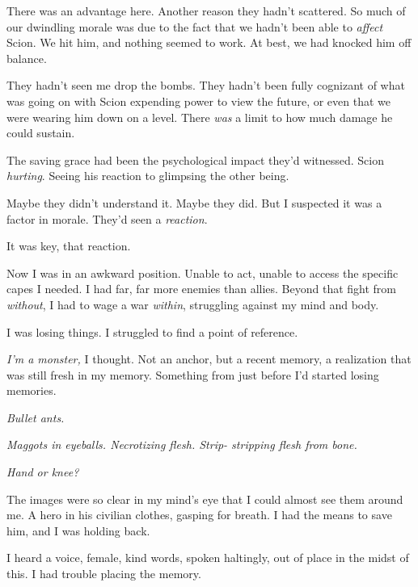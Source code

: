 There was an advantage here.  Another reason they hadn't scattered.  So much of our dwindling morale was due to the fact that we hadn't been able to \emph{affect} Scion.  We hit him, and nothing seemed to work.  At best, we had knocked him off balance.



They hadn't seen me drop the bombs.  They hadn't been fully cognizant of what was going on with Scion expending power to view the future, or even that we were wearing him down on a level.  There \emph{was} a limit to how much damage he could sustain.



The saving grace had been the psychological impact they'd witnessed.  Scion \emph{hurting}.  Seeing his reaction to glimpsing the other being.



Maybe they didn't understand it.  Maybe they did.  But I suspected it was a factor in morale.  They'd seen a \emph{reaction}.



It was key, that reaction.



Now I was in an awkward position.  Unable to act, unable to access the specific capes I needed.  I had far, far more enemies than allies.  Beyond that fight from \emph{without}, I had to wage a war \emph{within}, struggling against my mind and body.



I was losing things.  I struggled to find a point of reference.



\emph{I'm a monster, }I thought.  Not an anchor, but a recent memory, a realization that was still fresh in my memory.  Something from just before I'd started losing memories.



\emph{Bullet ants.}



\emph{Maggots in eyeballs.  Necrotizing flesh.  Strip- stripping flesh from bone.}



\emph{Hand or knee?}



The images were so clear in my mind's eye that I could almost see them around me.  A hero in his civilian clothes, gasping for breath.  I had the means to save him, and I was holding back.



I heard a voice, female, kind words, spoken haltingly, out of place in the midst of this.  I had trouble placing the memory.



